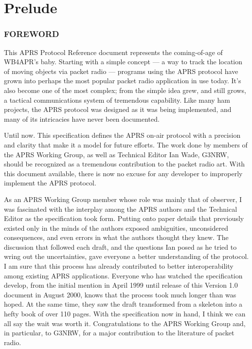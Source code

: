 \documentclass{scrreprt}[letter]
\begin{document}
\part{Prelude}

\section*{FOREWORD}

This APRS Protocol Reference document represents the coming-of-age of WB4APR’s baby.
Starting with a simple concept — a way to track the location of moving objects via packet radio
— programs using the APRS protocol have grown into perhaps the most popular packet radio
application in use today. It’s also become one of the most complex; from the simple idea grew,
and still grows, a tactical communications system of tremendous capability. Like many ham
projects, the APRS protocol was designed as it was being implemented, and many of its
intricacies have never been documented.

Until now. This specification defines the APRS on-air protocol with a precision and clarity that
make it a model for future efforts. The work done by members of the APRS Working Group, as
well as Technical Editor Ian Wade, G3NRW, should be recognized as a tremendous contribution
to the packet radio art. With this document available, there is now no excuse for any developer to
improperly implement the APRS protocol.

As an APRS Working Group member whose role was mainly that of observer, I was fascinated
with the interplay among the APRS authors and the Technical Editor as the specification took
form. Putting onto paper details that previously existed only in the minds of the authors exposed
ambiguities, unconsidered consequences, and even errors in what the authors thought they knew.
The discussion that followed each draft, and the questions Ian posed as he tried to wring out the
uncertainties, gave everyone a better understanding of the protocol. I am sure that this process has
already contributed to better interoperability among existing APRS applications.
Everyone who has watched the specification develop, from the initial mention in April 1999 until
release of this Version 1.0 document in August 2000, knows that the process took much longer
than was hoped. At the same time, they saw the draft transformed from a skeleton into a hefty
book of over 110 pages. With the specification now in hand, I think we can all say the wait was
worth it. Congratulations to the APRS Working Group and, in particular, to G3NRW, for a major
contribution to the literature of packet radio.
\end{document}
